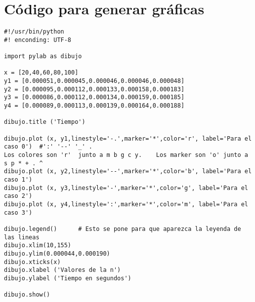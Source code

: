 \section{C\'odigo para generar gr\'aficas}
\label{Apendice2:label}

\begin{center}
\begin{footnotesize}

\begin{verbatim}
#!/usr/bin/python
#! enconding: UTF-8

import pylab as dibujo

x = [20,40,60,80,100]
y1 = [0.000051,0.000045,0.000046,0.000046,0.000048]
y2 = [0.000095,0.000112,0.000133,0.000158,0.000183]
y3 = [0.000086,0.000112,0.000134,0.000159,0.000185]
y4 = [0.000089,0.000113,0.000139,0.000164,0.000188]

dibujo.title ('Tiempo')

dibujo.plot (x, y1,linestyle='-.',marker='*',color='r', label='Para el caso 0')  #':' '--' '_' . 
Los colores son 'r'  junto a m b g c y.    Los marker son 'o' junto a s p * + . ^
dibujo.plot (x, y2,linestyle='--',marker='*',color='b', label='Para el caso 1')
dibujo.plot (x, y3,linestyle='-',marker='*',color='g', label='Para el caso 2')
dibujo.plot (x, y4,linestyle=':',marker='*',color='m', label='Para el caso 3')

dibujo.legend()      # Esto se pone para que aparezca la leyenda de las lineas
dibujo.xlim(10,155)
dibujo.ylim(0.000044,0.000190)
dibujo.xticks(x)
dibujo.xlabel ('Valores de la n')
dibujo.ylabel ('Tiempo en segundos')

dibujo.show()
\end{verbatim}

\end{footnotesize}
\end{center}
